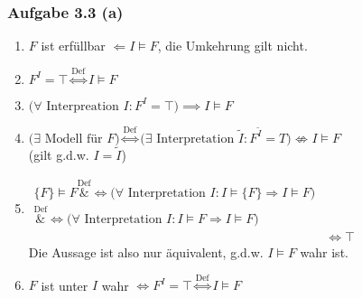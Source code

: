 \subsubsection{Aufgabe 3.3 (a)}
\begin{enumerate}[label=(\arabic*)]
	\item $F$ ist erfüllbar $\Longleftarrow I\models F$, die Umkehrung gilt nicht.
	\item $F^I=\top\stackrel{\text{Def}}{\Longleftrightarrow} I\models F$
	\item $\big(\forall\text{ Interpreation }I:F^I=\top\big)\implies I\models F$
	\item $\Big(\exists\text{ Modell für }F \Big)
		\stackrel{\text{Def}}{\Longleftrightarrow}
		\Big(\exists\text{ Interpretation }\tilde{I}:F^{\tilde{I}}=T\big)\not\Longleftrightarrow I\models F$\\
		(gilt g.d.w. $I=\tilde{I}$)
	\item $\begin{aligned}
		\lbrace F\rbrace\models F
		\overset{\text{Def}}&{\Longleftrightarrow}
		\big(\forall\text{ Interpretation }I:I\models\lbrace F\rbrace\Rightarrow I\models F\big)\\
		\overset{\text{Def}}&{\Longleftrightarrow}
		\big(\forall\text{ Interpretation }I:I\models F\Rightarrow I\models F\big)\\
		&\Longleftrightarrow\top
	\end{aligned}$\\
	Die Aussage ist also nur äquivalent, g.d.w. $I\models F$ wahr ist.
	\item $F$ ist unter $I$ wahr $\Longleftrightarrow F^I=\top\stackrel{\text{Def}}{\Longleftrightarrow} I\models F$
\end{enumerate}

